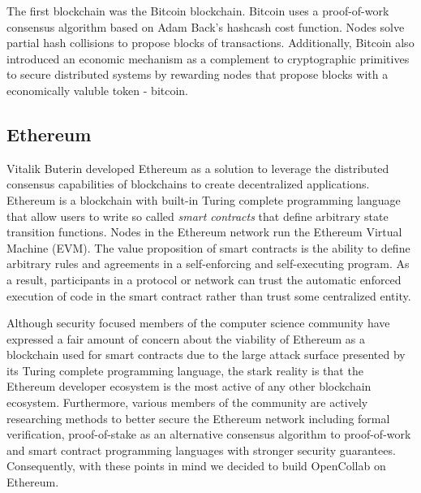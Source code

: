 The first blockchain was the Bitcoin blockchain\cite{bitcoin}. Bitcoin uses a
proof-of-work consensus algorithm based on Adam Back's hashcash cost function.
Nodes solve partial hash collisions to propose blocks of transactions. Additionally, Bitcoin also introduced an economic mechanism as a
complement to cryptographic primitives to secure distributed systems by
rewarding nodes that propose blocks with a economically valuble token - bitcoin.

\subsection{Ethereum}

Vitalik Buterin developed Ethereum as a solution to leverage the distributed
consensus capabilities of blockchains to create decentralized
applications. Ethereum is a blockchain with built-in Turing
complete programming language that allow users to write so called \textit{smart
  contracts} that define arbitrary state transition functions\cite{ethereum}.
Nodes in the Ethereum network run the Ethereum Virtual Machine (EVM). The value
proposition of smart contracts is the ability to define arbitrary rules and
agreements in a self-enforcing and self-executing program. As a result,
participants in a protocol or network can trust the automatic enforced execution
of code in the smart contract rather than trust some centralized entity.

Although security focused members of the computer science community have
expressed a fair amount of concern about the viability of Ethereum as a
blockchain used for smart contracts due to the large attack surface presented by
its Turing complete programming language, the stark reality is that the Ethereum
developer ecosystem is the most active of any other blockchain ecosystem.
Furthermore, various members of the community are actively researching methods
to better secure the Ethereum network including formal verification,
proof-of-stake as an alternative consensus algorithm to proof-of-work and smart
contract programming languages with stronger security guarantees.
Consequently, with these points in mind we decided to build OpenCollab on Ethereum.

